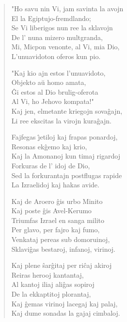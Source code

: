 \begin{verse}
                  "Ho savu nin Vi, jam savinta la avojn\\
                   \vin     El la Egiptujo-fremdlando;\\
                  Se Vi liberigos nun ree la sklavojn\\
                   \vin     De l' nuna mizero multgranda,\\
                  Mi, Micpon venonte, al Vi, mia Dio,\\
                  L'unuavidoton oferos kun pio.

                  "Kaj kio ajn estos l'unuavidoto,\\
                   \vin     Objekto a\u u homo amata,\\
                  \^Gi estos al Dio brulig-oferota\\
                   \vin     Al Vi, ho Jehovo kompata!"\\
                  Kaj jen, elmetante kriegojn sova\^gajn,\\
                  Li ree ekscitas la virojn kura\^gajn.

                  Fajfegas \^{\j}etiloj kaj frapas ponardoj,\\
                   \vin     Resonas ek\^gemo kaj krio,\\
                  Kaj la Amonanoj kun timaj rigardoj\\
                   \vin     Forkuras de l' idoj de Dio,\\
                  Sed la forkurantajn postflugas rapide\\
                  La Izraelidoj kaj hakas avide.

                  Kaj de Aroero \^gis urbo Minito\\
                   \vin     Kaj poste \^gis Avel-Kerumo\\
                  Triumfas Izrael en sanga milito\\
                   \vin     Per glavo, per fajro kaj fumo,\\
                  Venkataj pereas sub domoruinoj,\\
                  Sklavi\^gas bestaroj, infanoj, virinoj.

                  Kaj plene \^sar\^gitaj per ri\^caj akiroj\\
                   \vin     Reiras herooj kantantaj,\\
                  Al kantoj iliaj ali\^gas sopiroj\\
                   \vin     De la ekkaptitoj plorantaj,\\
                  Kaj \^gemas virinoj lacegaj kaj palaj,\\
                  Kaj dume sonadas la gajaj cimbaloj.


\end{verse}
